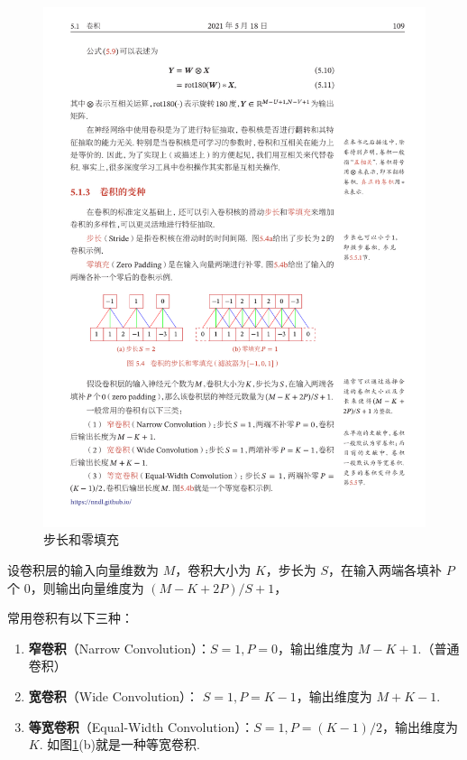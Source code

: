 \documentclass[12pt, a4paper, oneside]{ctexart}
\numberwithin{equation}{section}  %
\begin{document}
\begin{figure}[htbp]
    \centering
    \includegraphics[scale=1.2]{步长和零填充.pdf}
    \caption{步长和零填充}
    \label{fig-stride-zeropadding}
\end{figure}

设卷积层的输入向量维数为 \(M\)，卷积大小为 \(K\)，步长为
\(S\)，在输入两端各填补 \(P\) 个 \(0\)，则输出向量维度为
\((M-K+2P)/S+1\)，

常用卷积有以下三种：

\begin{enumerate}
\def\labelenumi{\arabic{enumi}.}
\item
  \textbf{窄卷积}（Narrow Convolution）：\(S=1, P=0\)，输出维度为
  \(M-K+1\).（普通卷积）
\item
  \textbf{宽卷积}（Wide Convolution）： \(S=1, P=K-1\)，输出维度为
  \(M+K-1\).
\item
  \textbf{等宽卷积}（Equal-Width
  Convolution）：\(S=1, P=(K-1)/2\)，输出维度为 \(K\).
  如图\ref{fig-stride-zeropadding}(b)就是一种等宽卷积.
\end{enumerate}
\end{document}
